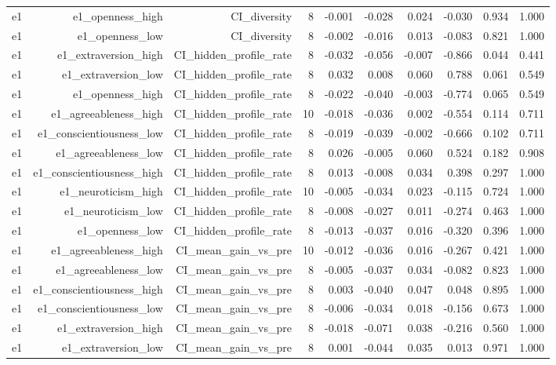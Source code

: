 \documentclass[11pt]{article}
\begin{document}
\begin{landscape}
\begin{longtable}{@{}lrrrrrrrrr@{}}
e1 & e1\_openness\_high & CI\_diversity & 8 & -0.001 & -0.028 & 0.024 & -0.030 & 0.934 & 1.000 \\
e1 & e1\_openness\_low & CI\_diversity & 8 & -0.002 & -0.016 & 0.013 & -0.083 & 0.821 & 1.000 \\
e1 & e1\_extraversion\_high & CI\_hidden\_profile\_rate & 8 & -0.032 & -0.056 & -0.007 & -0.866 & 0.044 & 0.441 \\
e1 & e1\_extraversion\_low & CI\_hidden\_profile\_rate & 8 & 0.032 & 0.008 & 0.060 & 0.788 & 0.061 & 0.549 \\
e1 & e1\_openness\_high & CI\_hidden\_profile\_rate & 8 & -0.022 & -0.040 & -0.003 & -0.774 & 0.065 & 0.549 \\
e1 & e1\_agreeableness\_high & CI\_hidden\_profile\_rate & 10 & -0.018 & -0.036 & 0.002 & -0.554 & 0.114 & 0.711 \\
e1 & e1\_conscientiousness\_low & CI\_hidden\_profile\_rate & 8 & -0.019 & -0.039 & -0.002 & -0.666 & 0.102 & 0.711 \\
e1 & e1\_agreeableness\_low & CI\_hidden\_profile\_rate & 8 & 0.026 & -0.005 & 0.060 & 0.524 & 0.182 & 0.908 \\
e1 & e1\_conscientiousness\_high & CI\_hidden\_profile\_rate & 8 & 0.013 & -0.008 & 0.034 & 0.398 & 0.297 & 1.000 \\
e1 & e1\_neuroticism\_high & CI\_hidden\_profile\_rate & 10 & -0.005 & -0.034 & 0.023 & -0.115 & 0.724 & 1.000 \\
e1 & e1\_neuroticism\_low & CI\_hidden\_profile\_rate & 8 & -0.008 & -0.027 & 0.011 & -0.274 & 0.463 & 1.000 \\
e1 & e1\_openness\_low & CI\_hidden\_profile\_rate & 8 & -0.013 & -0.037 & 0.016 & -0.320 & 0.396 & 1.000 \\
e1 & e1\_agreeableness\_high & CI\_mean\_gain\_vs\_pre & 10 & -0.012 & -0.036 & 0.016 & -0.267 & 0.421 & 1.000 \\
e1 & e1\_agreeableness\_low & CI\_mean\_gain\_vs\_pre & 8 & -0.005 & -0.037 & 0.034 & -0.082 & 0.823 & 1.000 \\
e1 & e1\_conscientiousness\_high & CI\_mean\_gain\_vs\_pre & 8 & 0.003 & -0.040 & 0.047 & 0.048 & 0.895 & 1.000 \\
e1 & e1\_conscientiousness\_low & CI\_mean\_gain\_vs\_pre & 8 & -0.006 & -0.034 & 0.018 & -0.156 & 0.673 & 1.000 \\
e1 & e1\_extraversion\_high & CI\_mean\_gain\_vs\_pre & 8 & -0.018 & -0.071 & 0.038 & -0.216 & 0.560 & 1.000 \\
e1 & e1\_extraversion\_low & CI\_mean\_gain\_vs\_pre & 8 & 0.001 & -0.044 & 0.035 & 0.013 & 0.971 & 1.000 \\

\end{longtable}
\end{landscape}
\end{document}
